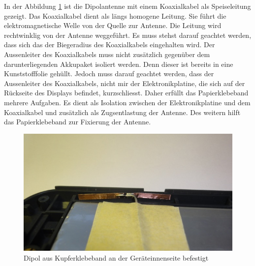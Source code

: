 In der Abbildung \ref{fig:DipolausKupferbandGeraeteinnenseite} ist  die Dipolantenne mit einem Koaxialkabel als Speiseleitung gezeigt. Das Koaxialkabel dient als längs homogene Leitung. Sie führt die elektromagnetische Welle von der Quelle zur Antenne. Die Leitung wird rechtwinklig von der Antenne weggeführt. Es muss stehst darauf geachtet werden, dass sich das der Biegeradius des Koaxialkabels eingehalten wird. Der Aussenleiter des Koaxialkabels muss nicht zusätzlich gegenüber dem darunterliegenden Akkupaket isoliert werden. Denn dieser ist bereits in eine Kunststofffolie gehüllt. Jedoch muss darauf geachtet werden, dass der Aussenleiter des Koaxialkabels, nicht mir der Elektronikplatine, die sich auf der Rückseite des Displays befindet, kurzschliesst. Daher erfüllt das Papierklebeband mehrere Aufgaben. Es dient als Isolation zwischen der Elektronikplatine und dem Koaxialkabel und zusätzlich als Zugsentlastung der Antenne. Des weitern hilft das Papierklebeband zur Fixierung der Antenne.\\
\begin{figure}[!ht]
	\centering
	\includegraphics[width=13cm]{content/bilder/Implementierung/DipolIMGeraet.jpg}%
	\caption{Dipol aus Kupferklebeband an der Geräteinnenseite befestigt}
	\label{fig:DipolausKupferbandGeraeteinnenseite}
\end{figure}

